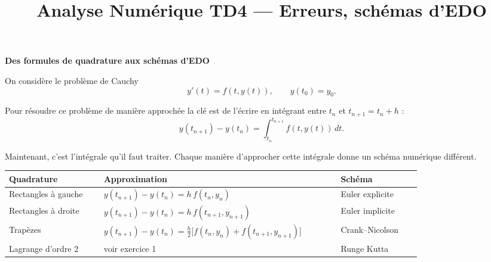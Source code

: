 

\title{Analyse Numérique TD4 --- Erreurs, schémas d'EDO}

\author{}
\date{}


\sffamily
\maketitle


\begin{mdframed}[backgroundcolor=ThemeLight, linecolor=Theme,
  linewidth=1.5pt, innertopmargin=10pt, innerbottommargin=10pt]
\textbf{\large Des formules de quadrature aux schémas d'EDO}

\medskip

On considère le problème de Cauchy
\[
  y'(t) = f(t,y(t)), \qquad y(t_0) = y_0.
\]

Pour résoudre ce problème de manière approchée la clé est de l'écrire en intégrant entre $t_n$ et $t_{n+1} = t_n + h$ :
\[
  y(t_{n+1}) - y(t_n) = \int_{t_n}^{t_{n+1}} f(t,y(t))\,dt.
\]

Maintenant, c'est l'intégrale qu'il faut traiter. Chaque manière d'approcher cette intégrale donne un schéma numérique différent.

\medskip

\begin{tabular}{|m{0.20\linewidth}|m{0.50\linewidth}|m{0.17\linewidth}|}
  \hline
  \textbf{Quadrature} & \textbf{Approximation} & \textbf{Schéma} \\[1em]
  \hline
  Rectangles à gauche &
    $\displaystyle  y(t_{n+1}) - y(t_n) = h\,f(t_n, y_n)$ &
    Euler explicite \\[1em]
  \hline
  Rectangles à droite &
    $\displaystyle  y(t_{n+1}) - y(t_n) = h\,f(t_{n+1}, y_{n+1})$ &
    Euler implicite \\[1em]
  \hline
  Trapèzes &
    $\displaystyle  y(t_{n+1}) - y(t_n) = \frac{h}{2}\bigl[f(t_n, y_n) + f(t_{n+1}, y_{n+1})\bigr]$ &
    Crank--Nicolson \\[1em]
  \hline
   Lagrange d'ordre 2 &
    voir exercice 1 &
    Runge Kutta\\[1em]
  \hline
\end{tabular}

\medskip

\end{mdframed}

